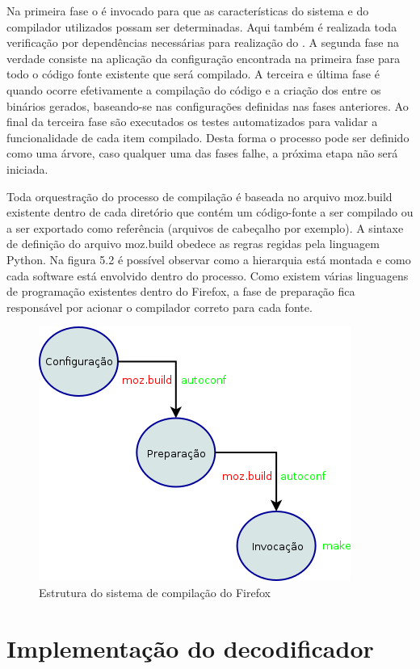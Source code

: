 \documentclass[espaco=simples,appendix=Name]{abnt}
\begin{document}
Na primeira fase o  é invocado para que as características do sistema e do compilador utilizados possam ser determinadas. Aqui também é realizada toda verificação por dependências necessárias para realização do . A segunda fase na verdade consiste na aplicação da configuração encontrada na primeira fase para todo o código fonte existente que será compilado. A terceira e última fase é quando ocorre efetivamente a compilação do código e a criação dos  entre os binários gerados, baseando-se nas configurações definidas nas fases anteriores. Ao final da terceira fase são executados os testes automatizados para validar a funcionalidade de cada item compilado. Desta forma o processo pode ser definido como uma árvore, caso qualquer uma das fases falhe, a próxima etapa não será iniciada.

Toda orquestração do processo de compilação é baseada no arquivo moz.build existente dentro de cada diretório que contém um código-fonte a ser compilado ou a ser exportado como referência (arquivos de cabeçalho por exemplo). A sintaxe de definição do arquivo moz.build obedece as regras regidas pela linguagem Python. Na figura 5.2 é possível observar como a hierarquia está montada e como cada software está envolvido dentro do processo. Como existem várias linguagens de programação existentes dentro do Firefox, a fase de preparação fica responsável por acionar o compilador correto para cada fonte.

\begin{figure}[h]
  \centering
    \includegraphics[scale=0.45]{BuildSystem.png}
  \caption{Estrutura do sistema de compilação do Firefox}
\end{figure}

\section{Implementação do decodificador}
\end{document}
